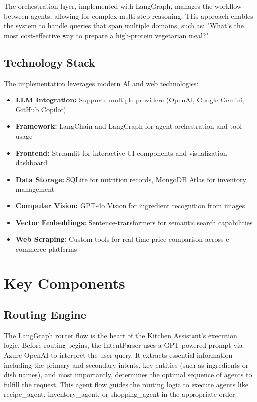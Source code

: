 \documentclass{ecai}
\begin{document}
The orchestration layer, implemented with LangGraph, manages the workflow between agents, allowing for complex multi-step reasoning. This approach enables the system to handle queries that span multiple domains, such as: "What's the most cost-effective way to prepare a high-protein vegetarian meal?"

\subsection{Technology Stack}

The implementation leverages modern AI and web technologies:

\begin{itemize}[noitemsep,topsep=0pt]
    \item \textbf{LLM Integration:} Supports multiple providers (OpenAI, Google Gemini, GitHub Copilot)
    \item \textbf{Framework:} LangChain and LangGraph for agent orchestration and tool usage
    \item \textbf{Frontend:} Streamlit for interactive UI components and visualization dashboard
    \item \textbf{Data Storage:} SQLite for nutrition records, MongoDB Atlas for inventory management
    \item \textbf{Computer Vision:} GPT-4o Vision for ingredient recognition from images
    \item \textbf{Vector Embeddings:} Sentence-transformers for semantic search capabilities
    \item \textbf{Web Scraping:} Custom tools for real-time price comparison across e-commerce platforms
\end{itemize}

\section{Key Components}

\subsection{Routing Engine}

The LangGraph router flow is the heart of the Kitchen Assistant's execution logic. Before routing begins, the IntentParser uses a GPT-powered prompt via Azure OpenAI to interpret the user query. It extracts essential information including the primary and secondary intents, key entities (such as ingredients or dish names), and most importantly, determines the optimal sequence of agents to fulfill the request. This agent flow guides the routing logic to execute agents like recipe\_agent, inventory\_agent, or shopping\_agent in the appropriate order.
\end{document}
